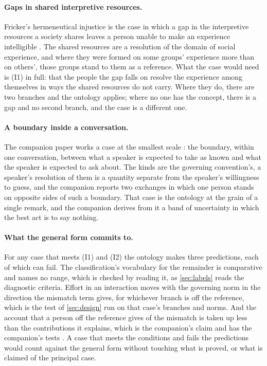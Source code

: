 \paragraph{Gaps in shared interpretive resources.} Fricker's hermeneutical injustice is the case in which a gap in the interpretive resources a society shares leaves a person unable to make an experience intelligible \cite{Fricker2007}. The shared resources are a resolution of the domain of social experience, and where they were formed on some groups' experience more than on others', those groups stand to them as a reference. What the case would need is (I1) in full: that the people the gap falls on resolve the experience among themselves in ways the shared resources do not carry. Where they do, there are two branches and the ontology applies; where no one has the concept, there is a gap and no second branch, and the case is a different one.

\paragraph{A boundary inside a conversation.} The companion paper works a case at the smallest scale \cite{Unconveyable}: the boundary, within one conversation, between what a speaker is expected to take as known and what the speaker is expected to ask about. The kinds are the governing convention's, a speaker's resolution of them is a quantity separate from the speaker's willingness to guess, and the companion reports two exchanges in which one person stands on opposite sides of such a boundary. That case is the ontology at the grain of a single remark, and the companion derives from it a band of uncertainty in which the best act is to say nothing.

\paragraph{What the general form commits to.} For any case that meets (I1) and (I2) the ontology makes three predictions, each of which can fail. The classification's vocabulary for the remainder is comparative and names no range, which is checked by reading it, as \autoref{sec:labels} reads the diagnostic criteria. Effort in an interaction moves with the governing norm in the direction the mismatch term gives, for whichever branch is off the reference, which is the test of \autoref{sec:design} run on that case's branches and norms. And the account that a person off the reference gives of the mismatch is taken up less than the contributions it explains, which is the companion's claim and has the companion's tests \cite{Unconveyable}. A case that meets the conditions and fails the predictions would count against the general form without touching what is proved, or what is claimed of the principal case.

